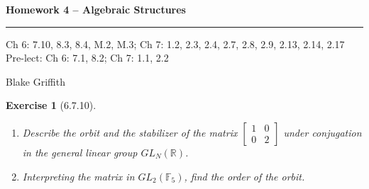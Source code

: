 \documentclass[12pt]{article}
\newtheorem*{exer}{Exercise}
\begin{document}
\textbf{Homework 4 -- Algebraic Structures} \\

\hrule

\begin{minipage}{.80\linewidth}
    \flushleft
    Ch 6: 7.10, 8.3, 8.4, M.2, M.3; Ch 7: 1.2, 2.3, 2.4, 2.7, 2.8, 2.9,
    2.13, 2.14, 2.17 \\
    Pre-lect: Ch 6: 7.1, 8.2; Ch 7: 1.1, 2.2 \\
\end{minipage}
\begin{minipage}{.20\linewidth}
    \flushright
    Blake Griffith
\end{minipage}

\begin{exer}[6.7.10]
    \begin{enumerate}
        \item Describe the orbit and the stabilizer of the matrix
            $\left[
                \begin{array}{cc}
                    1 & 0 \\
                    0 & 2 
                \end{array}
            \right]$
            under conjugation in the general linear group $GL_N (
            \mathbb{R})$.

        \item Interpreting the matrix in $GL_2(\mathbb{F}_5)$, find
            the order of the orbit.
    \end{enumerate}
\end{exer}
\end{document}
